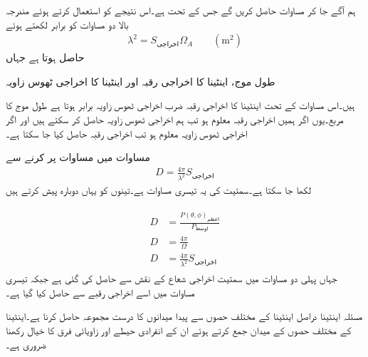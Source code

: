 ہم آگے جا کر مساوات  حاصل کریں گے جس کے تحت   ہے۔اس نتیجے کو استعمال کرتے ہوئے مندرجہ بالا دو مساوات کو برابر لکھتے ہوئے
\begin{align}\label{مساوات_اینٹینا_اخراجی_ٹھوس_زاویہ_اخراجی_رقبہ_تعلق}
\lambda^2 =S_{\text{اخراجی}} \Omega_A \quad \quad (\si{\meter \squared})
\end{align}
حاصل ہوتا ہے جہاں
\begin{description}
 طول موج،
  اینٹینا کا اخراجی رقبہ اور
 اینٹینا کا اخراجی ٹھوس زاویہ
\end{description}
ہیں۔اس مساوات کے تحت اینٹینا کا اخراجی رقبہ ضرب اخراجی ٹھوس زاویہ برابر ہوتا ہے  طول موج کا مربع۔یوں اگر ہمیں اخراجی رقبہ معلوم ہو تب ہم اخراجی ٹھوس زاویہ حاصل کر سکتے ہیں اور اگر اخراجی ٹھوس زاویہ معلوم ہو تب اخراجی رقبہ حاصل کیا جا سکتا ہے۔

مساوات  میں مساوات  پر کرنے سے
\begin{align}
D=\frac{4\pi}{\lambda^2} S_{\text{اخراجی}}
\end{align}
لکھا جا سکتا ہے۔سمتیت کی یہ تیسری مساوات ہے۔تینوں کو یہاں دوبارہ پیش کرتے ہیں

\begin{gather}
\begin{aligned}\label{مساوات_اینٹینا_سمتیت_مختلف_تعارف}
D&=\frac{P(\theta,\phi)_{\text{اعظم}}}{P_{\text{اوسط}}} \\
D&=\frac{4\pi}{\Omega} \\
D&=\frac{4\pi}{\lambda^2} S_{\text{اخراجی}}
\end{aligned}
\end{gather}
جہاں پہلی دو مساوات میں سمتیت اخراجی شعاع کے نقش سے حاصل کی گئی ہے جبکہ تیسری مساوات میں اسے اخراجی رقبے سے حاصل کیا گیا ہے۔

مسئلہ اینٹینا دراصل اینٹینا کے مختلف حصوں سے پیدا میدانوں کا درست مجموعہ حاصل کرنا ہے۔اینٹینا کے مختلف حصوں کے میدان جمع کرتے ہوئے ان کے انفرادی حیطے اور زاویائی فرق کا خیال رکھنا ضروری ہے۔


